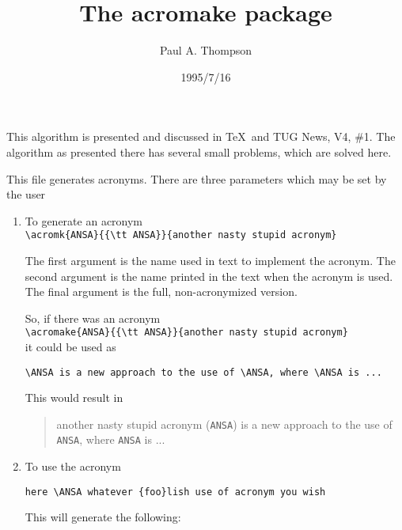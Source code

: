 \documentclass[DIV=10, fontsize=12pt, pagesize=auto]{scrartcl}
\title{The \textsf{acromake} package}
\author{Paul A. Thompson}
\date{1995/7/16}
\begin{document}
\maketitle

\noindent
This algorithm is presented and discussed in \TeX\ and TUG News, V4, \#1.
The algorithm as presented there has several small problems, which are
solved here.

This file generates acronyms.  There are three parameters which may be
set by the user
%
\begin{enumerate}
\item To generate an acronym \\
  \verb+\acromk{ANSA}{{\tt ANSA}}{another nasty stupid acronym}+
  
  The first argument is the name used in text to implement the acronym.
  The second argument is the name printed in the text when the acronym
  is used.  The final argument is the full, non-acronymized version.
  
  So, if there was an acronym \\
  \verb+\acromake{ANSA}{{\tt ANSA}}{another nasty stupid acronym}+ \\
  it could be used as 
\begin{verbatim}
\ANSA is a new approach to the use of \ANSA, where \ANSA is ...
\end{verbatim}
  
  This would result in
  \begin{quote}
    another nasty stupid acronym ({\tt ANSA}) is a new approach to 
    the use of {\tt ANSA}, where {\tt ANSA} is ...
  \end{quote}
\item To use the acronym
\begin{verbatim}
here \ANSA whatever {foo}lish use of acronym you wish
\end{verbatim}
  
  This will generate the following:\nopagebreak


\end{enumerate}
\end{document}
